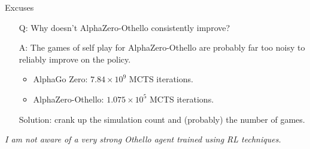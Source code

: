 \documentclass{beamer}
\begin{document}
\begin{frame}{Excuses}
  \begin{enumerate}
  \item[Q:] Why doesn't AlphaZero-Othello consistently improve?
\item[A:] The games of self play for AlphaZero-Othello are probably far too noisy to reliably improve on the policy.
  \begin{itemize}
  \item AlphaGo Zero: $7.84 \times 10^9$ MCTS iterations.
  \item AlphaZero-Othello: $1.075\times10^5$ MCTS iterations.
  \end{itemize}
  Solution: crank up the simulation count and (probably) the number of games.
  \end{enumerate}

  \textit{I am not aware of a very strong Othello agent trained using RL techniques.}
\end{frame}
\end{document}
